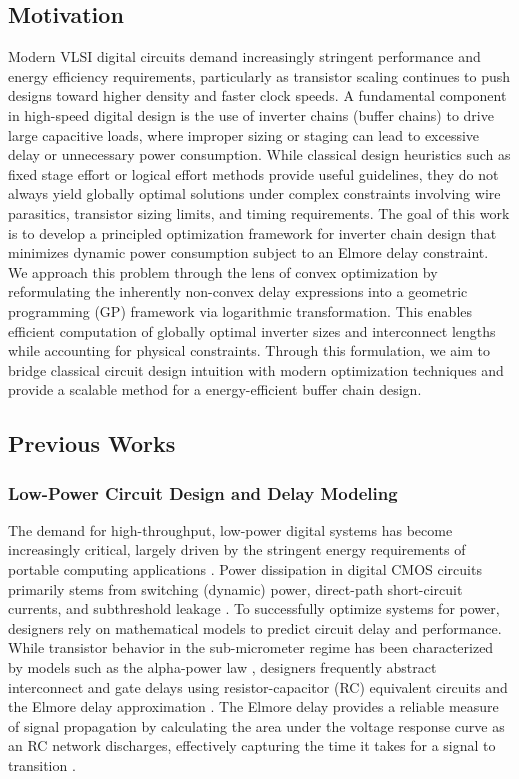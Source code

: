 \documentclass{article}
\begin{document}
\subsection{Motivation}
Modern VLSI digital circuits demand increasingly stringent performance
and energy efficiency requirements, particularly as transistor scaling continues
to push designs toward higher density and faster clock speeds. A fundamental
component in high-speed digital design is the use of inverter chains (buffer chains)
to drive large capacitive loads, where improper sizing or staging can lead to excessive
delay or unnecessary power consumption. While classical design heuristics such as fixed
stage effort or logical effort methods provide useful guidelines, they do not always yield
globally optimal solutions under complex constraints involving wire parasitics, transistor
sizing limits, and timing requirements. The goal of this work is to develop a principled
optimization framework for inverter chain design that minimizes dynamic power consumption
subject to an Elmore delay constraint. We approach this problem through the lens of convex
optimization by reformulating the inherently non-convex delay expressions into a geometric
programming (GP) framework via logarithmic transformation. This enables efficient computation
of globally optimal inverter sizes and interconnect lengths while accounting for physical
constraints. Through this formulation, we aim to bridge classical circuit design intuition
with modern optimization techniques and provide a scalable method for a energy-efficient
buffer chain design.
\subsection{Previous Works}
	\subsubsection {Low-Power Circuit Design and Delay Modeling}
		The demand for high-throughput, low-power digital systems has become increasingly critical, largely 
		driven by the stringent energy requirements of portable computing applications \cite{cmos}. Power 
		dissipation in digital CMOS circuits primarily stems from switching (dynamic) power, direct-path 
		short-circuit currents, and subthreshold leakage \cite{cmos}. To successfully optimize systems for 
		power, designers rely on mathematical models to predict circuit delay and performance. While 
		transistor behavior in the sub-micrometer regime has been characterized by models such as 
		the alpha-power law \cite{alpha}, designers frequently abstract interconnect and gate delays 
		using resistor-capacitor (RC) equivalent circuits and the Elmore delay approximation \cite{gp}.
		The Elmore delay provides a reliable measure of signal propagation by calculating the area under
		the voltage response curve as an RC network discharges, effectively capturing the time it takes 
		for a signal to transition \cite{gp}.
\end{document}
